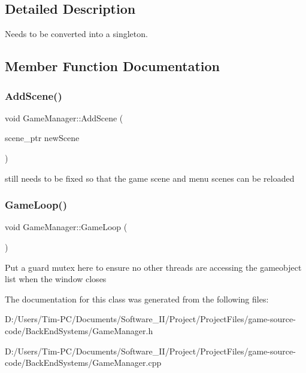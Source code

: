 \subsection{Detailed Description}
Needs to be converted into a singleton. 

\subsection{Member Function Documentation}
\mbox{\label{class_game_manager_a65e593032333cee8723ad08ebfe897fc}} 
\subsubsection{\texorpdfstring{Add\+Scene()}{AddScene()}}
{\footnotesize\ttfamily void Game\+Manager\+::\+Add\+Scene (\begin{DoxyParamCaption}\item[{scene\+\_\+ptr}]{new\+Scene }\end{DoxyParamCaption})}

still needs to be fixed so that the game scene and menu scenes can be reloaded \mbox{\label{class_game_manager_a5baa570812ae717f809fe0dc48bde22e}} 
\subsubsection{\texorpdfstring{Game\+Loop()}{GameLoop()}}
{\footnotesize\ttfamily void Game\+Manager\+::\+Game\+Loop (\begin{DoxyParamCaption}{ }\end{DoxyParamCaption})}

Put a guard mutex here to ensure no other threads are accessing the gameobject list when the window closes 

The documentation for this class was generated from the following files\+:\begin{DoxyCompactItemize}
\item 
D\+:/\+Users/\+Tim-\/\+P\+C/\+Documents/\+Software\+\_\+\+I\+I/\+Project/\+Project\+Files/game-\/source-\/code/\+Back\+End\+Systems/Game\+Manager.\+h\item 
D\+:/\+Users/\+Tim-\/\+P\+C/\+Documents/\+Software\+\_\+\+I\+I/\+Project/\+Project\+Files/game-\/source-\/code/\+Back\+End\+Systems/Game\+Manager.\+cpp\end{DoxyCompactItemize}
